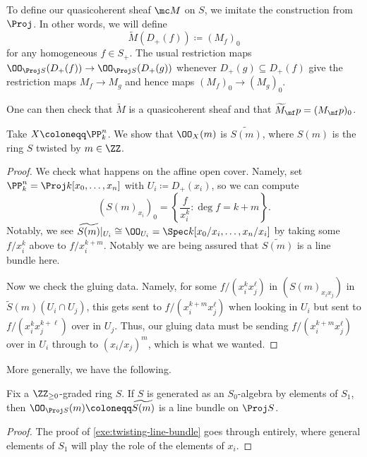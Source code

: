\documentclass[../notes.tex]{subfiles}
\begin{document}
To define our quasicoherent sheaf $\mc M$ on $S$, we imitate the construction from $\Proj$. In other words, we will define
\[\widetilde M(D_+(f))\coloneqq(M_f)_0\]
for any homogeneous $f\in S_+$. The usual restriction maps $\OO_{\Proj S}(D_+(f))\to\OO_{\Proj S}(D_+(g))$ whenever $D_+(g)\subseteq D_+(f)$ give the restriction maps $M_f\to M_g$ and hence maps $(M_f)_0\to(M_g)_0$.
\begin{remark}
	One can then check that $\widetilde M$ is a quasicoherent sheaf and that $\widetilde M_\mf p=(M_\mf p)_0$.
\end{remark}
\begin{exe} \label{exe:twisting-line-bundle}
	Take $X\coloneqq\PP^n_k$. We show that $\OO_X(m)$ is $\widetilde{S(m)}$, where $S(m)$ is the ring $S$ twisted by $m\in\ZZ$.
\end{exe}
\begin{proof}
	We check what happens on the affine open cover. Namely, set $\PP^n_k=\Proj k[x_0,\ldots,x_n]$ with $U_i\coloneqq D_+(x_i)$, so we can compute
	\[(S(m)_{x_i})_0=\left\{\frac f{x_i^k}:\deg f=k+m\right\}.\]
	Notably, we see $\widetilde{S(m)}|_{U_i}\cong\OO_{U_i}=\Spec k[x_0/x_i,\ldots,x_n/x_i]$ by taking some $f/x_i^k$ above to $f/x_i^{k+m}$. Notably we are being assured that $\widetilde{S(m)}$ is a line bundle here.

	Now we check the gluing data. Namely, for some $f/(x_i^kx_j^\ell)$ in $(S(m)_{x_ix_j})$ in $\widetilde S(m)(U_i\cap U_j)$, this gets sent to $f/(x_i^{k+m}x_j^\ell)$ when looking in $U_i$ but sent to $f/(x_i^kx_j^{k+\ell})$ over in $U_j$. Thus, our gluing data must be sending $f/(x_i^{k+m}x_j^\ell)$ over in $U_i$ through to $(x_i/x_j)^m$, which is what we wanted.
\end{proof}
More generally, we have the following.
\begin{proposition}
	Fix a $\ZZ_{\ge0}$-graded ring $S$. If $S$ is generated as an $S_0$-algebra by elements of $S_1$, then $\OO_{\Proj S}(m)\coloneqq\widetilde{S(m)}$ is a line bundle on $\Proj S$.
\end{proposition}
\begin{proof}
	The proof of \autoref{exe:twisting-line-bundle} goes through entirely, where general elements of $S_1$ will play the role of the elements of $x_i$.
\end{proof}
\end{document}
